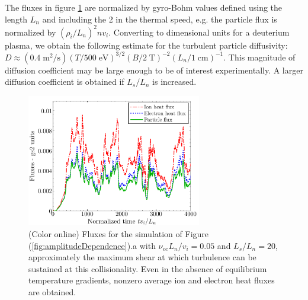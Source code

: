 \documentclass[12pt,superscriptaddress]{revtex4}
\newcommand{\nuee}{\nu_{ee}}
\begin{document}
The fluxes in figure \ref{fig:fluxes} are normalized by gyro-Bohm values defined using the length $L_n$ and including the 2 in the thermal speed, e.g.
the particle flux is normalized by $(\rho_i / L_n)^2 n v_i$.
Converting to dimensional units for a deuterium plasma, we obtain the following estimate for the turbulent particle diffusivity:
$D \approx \left( 0.4 \mathrm{ \;m^2/s}\right)
\left(T / 500 \mathrm{\;eV}\right)^{3/2}
\left(B/2\mathrm{\;T}\right)^{-2} \left( L_n / 1 \mathrm{\;cm}\right)^{-1}$.
This magnitude of diffusion coefficient may be large enough to be of interest experimentally.
A larger diffusion coefficient is obtained if $L_s/L_n$ is increased.

\begin{figure}[h!]
\includegraphics[width=3in]{m20141210_01_plotGs2FluxesVsTimeForPaper.pdf}
\caption{(Color online)
Fluxes for the simulation of Figure (\ref{fig:amplitudeDependence}).a with  $\nuee L_n / v_i = 0.05$ and
$L_s/L_n=20$, approximately the maximum shear at which turbulence can be sustained at this collisionality.
Even in the absence of equilibrium temperature gradients, nonzero average ion and electron heat fluxes
are obtained.
\label{fig:fluxes}}
\end{figure}
\end{document}
